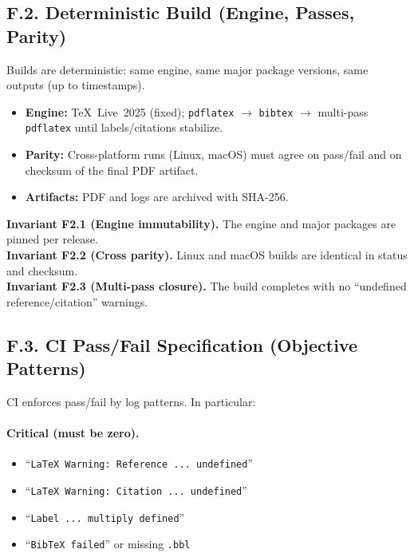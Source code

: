 \subsection*{F.2. Deterministic Build (Engine, Passes, Parity)}

\noindent
Builds are deterministic: same engine, same major package versions, same outputs (up to timestamps).

\begin{itemize}
  \item \textbf{Engine:} TeX~Live~2025 (fixed); \texttt{pdflatex} $\to$ \texttt{bibtex} $\to$ multi-pass \texttt{pdflatex} until labels/citations stabilize.
  \item \textbf{Parity:} Cross-platform runs (Linux, macOS) must agree on pass/fail and on checksum of the final PDF artifact.
  \item \textbf{Artifacts:} PDF and logs are archived with SHA-256.
\end{itemize}

\noindent\textbf{Invariant F2.1 (Engine immutability).} The engine and major packages are pinned per release.\\
\textbf{Invariant F2.2 (Cross parity).} Linux and macOS builds are identical in status and checksum.\\
\textbf{Invariant F2.3 (Multi-pass closure).} The build completes with no “undefined reference/citation” warnings.


\subsection*{F.3. CI Pass/Fail Specification (Objective Patterns)}

\noindent
CI enforces pass/fail by log patterns. In particular:

\paragraph{Critical (must be zero).}
\begin{itemize}
  \item “\texttt{LaTeX Warning: Reference ... undefined}”
  \item “\texttt{LaTeX Warning: Citation ... undefined}”
  \item “\texttt{Label ... multiply defined}”
  \item “\texttt{BibTeX failed}” or missing \texttt{.bbl}
\end{itemize}

